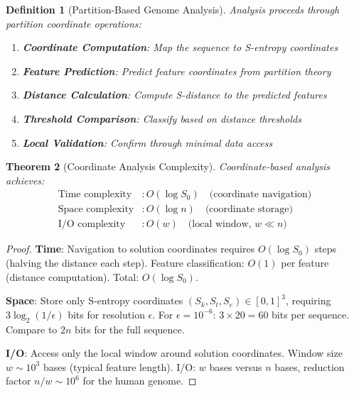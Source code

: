 \documentclass[11pt,a4paper]{article}
\newtheorem{theorem}{Theorem}[section]
\newtheorem{definition}[theorem]{Definition}
\theoremstyle{remark}
\newcommand{\Sk}{S_k}
\newcommand{\St}{S_t}
\newcommand{\Se}{S_e}
\begin{document}
\begin{definition}[Partition-Based Genome Analysis]
\label{def:partition_analysis}
Analysis proceeds through partition coordinate operations:
\begin{enumerate}
\item \textbf{Coordinate Computation}: Map the sequence to S-entropy coordinates
\item \textbf{Feature Prediction}: Predict feature coordinates from partition theory
\item \textbf{Distance Calculation}: Compute S-distance to the predicted features
\item \textbf{Threshold Comparison}: Classify based on distance thresholds
\item \textbf{Local Validation}: Confirm through minimal data access
\end{enumerate}
\end{definition}

\begin{theorem}[Coordinate Analysis Complexity]
\label{thm:coordinate_analysis_complexity}
Coordinate-based analysis achieves:
\begin{align}
\text{Time complexity} &: O(\log S_0) \quad \text{(coordinate navigation)} \\
\text{Space complexity} &: O(\log n) \quad \text{(coordinate storage)} \\
\text{I/O complexity} &: O(w) \quad \text{(local window, } w \ll n\text{)}
\end{align}
\end{theorem}

\begin{proof}
\textbf{Time}: Navigation to solution coordinates requires $O(\log S_0)$ steps (halving the distance each step). Feature classification: $O(1)$ per feature (distance computation). Total: $O(\log S_0)$.

\textbf{Space}: Store only S-entropy coordinates $(\Sk, \St, \Se) \in [0,1]^3$, requiring $3\log_2(1/\epsilon)$ bits for resolution $\epsilon$. For $\epsilon = 10^{-6}$: $3 \times 20 = 60$ bits per sequence. Compare to $2n$ bits for the full sequence.

\textbf{I/O}: Access only the local window around solution coordinates. Window size $w \sim 10^3$ bases (typical feature length). I/O: $w$ bases versus $n$ bases, reduction factor $n/w \sim 10^6$ for the human genome.
\end{proof}
\end{document}
